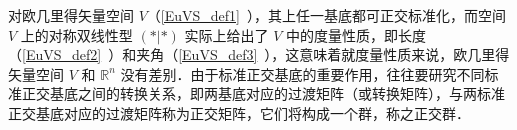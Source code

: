 
对欧几里得矢量空间 $V$（\autoref{EuVS_def1}~），其上任一基底都可正交标准化，而空间 $V$ 上的对称双线性型 $(*|*)$ 实际上给出了 $V$ 中的度量性质，即长度（\autoref{EuVS_def2}~）和夹角（\autoref{EuVS_def3}~），这意味着就度量性质来说，欧几里得矢量空间 $V$ 和 $\mathbb{R}^n$ 没有差别．由于标准正交基底的重要作用，往往要研究不同标准正交基底之间的转换关系，即两基底对应的过渡矩阵（或转换矩阵），与两标准正交基底对应的过渡矩阵称为正交矩阵，它们将构成一个群，称之正交群．